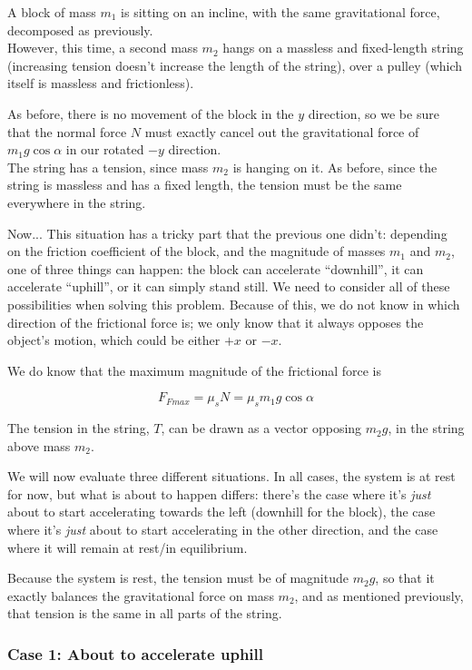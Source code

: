 A block of mass $m_1$ is sitting on an incline, with the same gravitational force, decomposed as previously.\\
However, this time, a second mass $m_2$ hangs on a massless and fixed-length string (increasing tension doesn't increase the length of the string), over a pulley (which itself is massless and frictionless).

As before, there is no movement of the  block in the $y$ direction, so we be sure that the normal force $N$ must exactly cancel out the gravitational force of $m_1 g \cos \alpha$ in our rotated $-y$ direction.\\
The string has a tension, since mass $m_2$ is hanging on it. As before, since the string is massless and has a fixed length, the tension must be the same everywhere in the string.

Now... This situation has a tricky part that the previous one didn't: depending on the friction coefficient of the block, and the magnitude of masses $m_1$ and $m_2$, one of three things can happen: the block can accelerate ``downhill'', it can accelerate ``uphill'', or it can simply stand still. We need to consider all of these possibilities when solving this problem. Because of this, we do not know in which direction of the frictional force is; we only know that it always opposes the object's motion, which could be either $+x$ or $-x$.

We do know that the maximum magnitude of the frictional force is

\begin{equation}
F_{Fmax} = \mu_s N = \mu_s m_1 g \cos \alpha
\end{equation}

The tension in the string, $T$, can be drawn as a vector opposing $m_2 g$, in the string above mass $m_2$.

We will now evaluate three different situations. In all cases, the system is at rest for now, but what is about to happen differs: there's the case where it's \emph{just} about to start accelerating towards the left (downhill for the block), the case where it's \emph{just} about to start accelerating in the other direction, and the case where it will remain at rest/in equilibrium.

Because the system is rest, the tension must be of magnitude $m_2 g$, so that it exactly balances the gravitational force on mass $m_2$, and as mentioned previously, that tension is the same in all parts of the string.

\subsubsection{Case 1: About to accelerate uphill}

